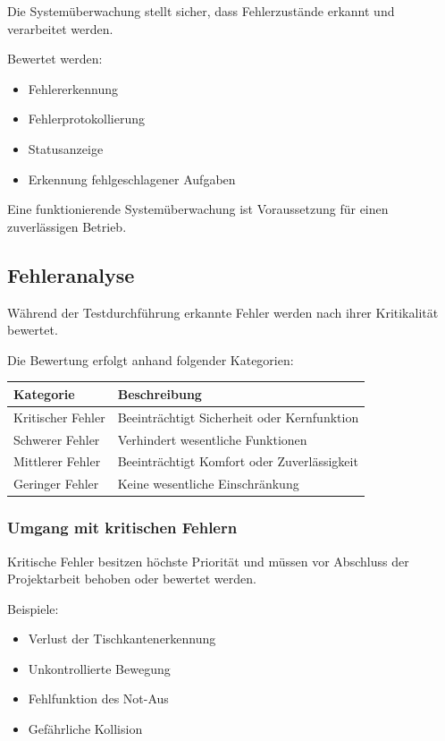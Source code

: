\documentclass[
  a4paper,
  12pt,
  DIV=12,        %
  parskip=half,  %
  headings=small %
]{scrartcl}
\theoremstyle{definition}
\providecommand{\tightlist}{%
  \setlength{\itemsep}{0pt}\setlength{\parskip}{0pt}}
\theoremstyle{definition}
\begin{document}
Die Systemüberwachung stellt sicher, dass Fehlerzustände erkannt und
verarbeitet werden.

Bewertet werden:

\begin{itemize}
\tightlist
\item
  Fehlererkennung
\item
  Fehlerprotokollierung
\item
  Statusanzeige
\item
  Erkennung fehlgeschlagener Aufgaben
\end{itemize}

Eine funktionierende Systemüberwachung ist Voraussetzung für einen
zuverlässigen Betrieb.

\subsection{Fehleranalyse}\label{fehleranalyse}

Während der Testdurchführung erkannte Fehler werden nach ihrer
Kritikalität bewertet.

Die Bewertung erfolgt anhand folgender Kategorien:

\begin{longtable}[]{@{}ll@{}}
\toprule\noalign{}
Kategorie & Beschreibung \\
\midrule\noalign{}
\endhead
\bottomrule\noalign{}
\endlastfoot
Kritischer Fehler & Beeinträchtigt Sicherheit oder Kernfunktion \\
Schwerer Fehler & Verhindert wesentliche Funktionen \\
Mittlerer Fehler & Beeinträchtigt Komfort oder Zuverlässigkeit \\
Geringer Fehler & Keine wesentliche Einschränkung \\
\end{longtable}

\subsubsection{Umgang mit kritischen
Fehlern}\label{umgang-mit-kritischen-fehlern}

Kritische Fehler besitzen höchste Priorität und müssen vor Abschluss der
Projektarbeit behoben oder bewertet werden.

Beispiele:

\begin{itemize}
\tightlist
\item
  Verlust der Tischkantenerkennung
\item
  Unkontrollierte Bewegung
\item
  Fehlfunktion des Not-Aus
\item
  Gefährliche Kollision
\end{itemize}
\end{document}
